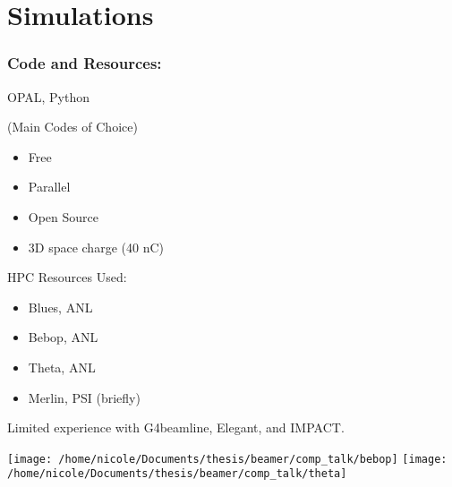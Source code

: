 \documentclass[professionalfonts,t]{beamer}
\begin{document}


\section{Simulations}
	
\begin{frame}
\frametitle{Code and Resources: }

\begin{minipage}{0.5\textwidth}
	OPAL, Python 
	
	(Main Codes of Choice)
	\begin{itemize}
		\item Free
		\item Parallel 
		\item Open Source
		\item 3D space charge (40 nC)
	\end{itemize}	
\end{minipage}
\begin{minipage}{0.4\textwidth}
	HPC Resources Used:
	\begin{itemize}
		\item Blues, ANL
		\item Bebop, ANL
		\item Theta, ANL
		\item Merlin, PSI (briefly)
	\end{itemize}
\end{minipage}
\vspace{0.5em}

\centering

Limited experience with G4beamline, Elegant, and IMPACT.
\vspace{0.5em}

\texttt{[image: /home/nicole/Documents/thesis/beamer/comp\_talk/bebop]} \hspace{1em} \texttt{[image: /home/nicole/Documents/thesis/beamer/comp\_talk/theta]}

\end{frame}


\iffalse
\begin{frame}
\frametitle{Drive Line Layout}
\begin{tikzpicture}[scale=\textwidth/20cm, text=black]

\end{tikzpicture}
For the remainder of the talk, I will focus on simulation and experimental results for the beam line above.
\end{frame}
\fi
 
\end{document}
